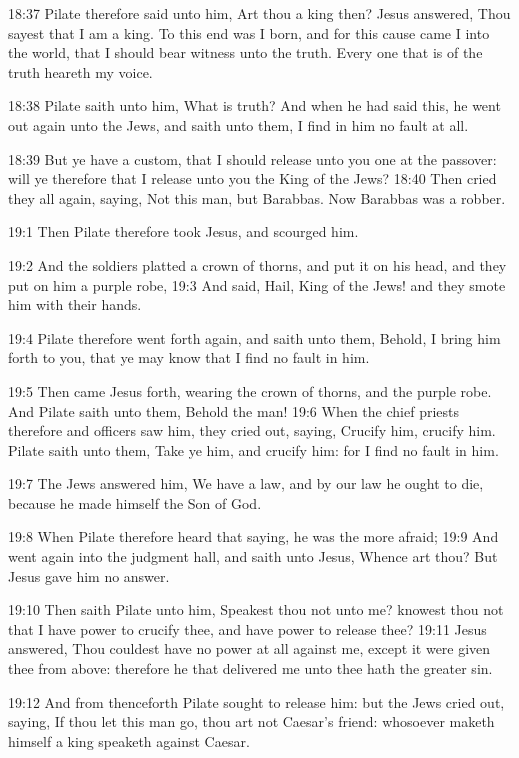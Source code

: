 18:37 Pilate therefore said unto him, Art thou a king then? Jesus
answered, Thou sayest that I am a king. To this end was I born, and
for this cause came I into the world, that I should bear witness unto
the truth. Every one that is of the truth heareth my voice.

18:38 Pilate saith unto him, What is truth? And when he had said this,
he went out again unto the Jews, and saith unto them, I find in him no
fault at all.

18:39 But ye have a custom, that I should release unto you one at the
passover: will ye therefore that I release unto you the King of the
Jews?  18:40 Then cried they all again, saying, Not this man, but
Barabbas. Now Barabbas was a robber.

19:1 Then Pilate therefore took Jesus, and scourged him.

19:2 And the soldiers platted a crown of thorns, and put it on his
head, and they put on him a purple robe, 19:3 And said, Hail, King of
the Jews! and they smote him with their hands.

19:4 Pilate therefore went forth again, and saith unto them, Behold, I
bring him forth to you, that ye may know that I find no fault in him.

19:5 Then came Jesus forth, wearing the crown of thorns, and the
purple robe. And Pilate saith unto them, Behold the man!  19:6 When
the chief priests therefore and officers saw him, they cried out,
saying, Crucify him, crucify him. Pilate saith unto them, Take ye him,
and crucify him: for I find no fault in him.

19:7 The Jews answered him, We have a law, and by our law he ought to
die, because he made himself the Son of God.

19:8 When Pilate therefore heard that saying, he was the more afraid;
19:9 And went again into the judgment hall, and saith unto Jesus,
Whence art thou? But Jesus gave him no answer.

19:10 Then saith Pilate unto him, Speakest thou not unto me? knowest
thou not that I have power to crucify thee, and have power to release
thee?  19:11 Jesus answered, Thou couldest have no power at all
against me, except it were given thee from above: therefore he that
delivered me unto thee hath the greater sin.

19:12 And from thenceforth Pilate sought to release him: but the Jews
cried out, saying, If thou let this man go, thou art not Caesar's
friend: whosoever maketh himself a king speaketh against Caesar.

